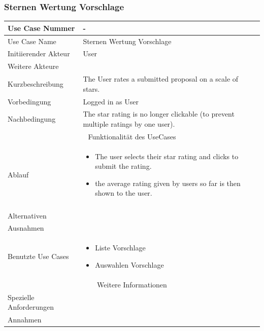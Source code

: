 \documentclass[10pt,a4paper]{article}
\begin{document}
	\subsubsection{Sternen Wertung Vorschlage}
	\begin{tabular}{|l|p{.5\linewidth}|}
	\hline Use Case Nummer & - \\ 
	\hline Use Case Name & Sternen Wertung Vorschlage \\ 
	\hline Initiierender Akteur & User \\
	\hline Weitere Akteure & \\
	\hline Kurzbeschreibung & The User rates a submitted proposal on a scale of stars. \\
	\hline Vorbedingung & Logged in as User \\
	\hline Nachbedingung & The star rating is no longer clickable (to prevent multiple ratings by one user). \\
	\hline \multicolumn{2}{|c|}{Funktionalität des UseCases}\\
	\hline Ablauf & \begin{itemize}
			\item The user selects their star rating and clicks to submit the rating.
			\item the average rating given by users so far is then shown to the user.
		\end{itemize} \\ \\
	\hline Alternativen &  \\
	\hline Ausnahmen &  \\
	\hline Benutzte Use Cases & \begin{itemize}
			\item Liste Vorschlage
			\item Auswahlen Vorschlage
		\end{itemize} \\
	\hline \multicolumn{2}{|c|}{Weitere Informationen} \\
	\hline Spezielle Anforderungen &  \\
	\hline Annahmen &  \\
	\hline
	\end{tabular}
	
\end{document}
